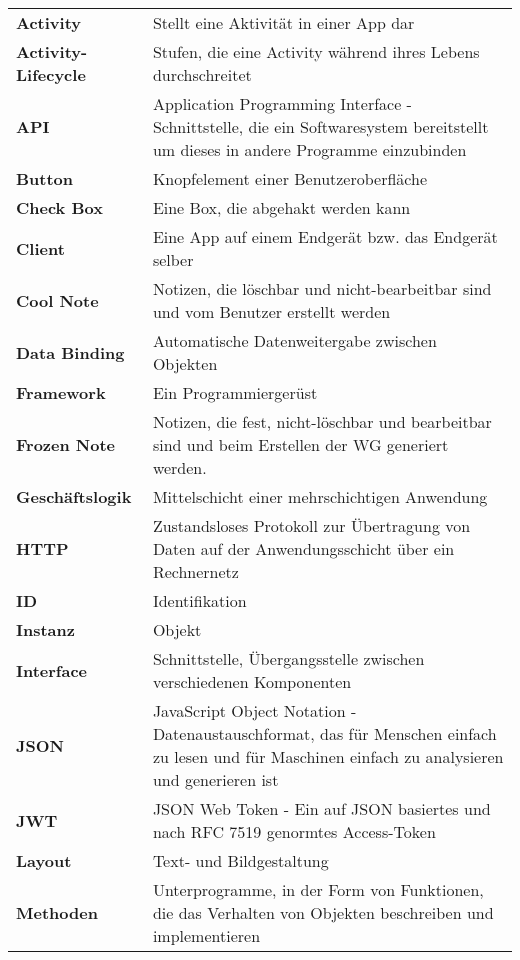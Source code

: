 \begin{table}[h!]
			\centering
			\label{my-label}
			\begin{tabular}{p{4cm}p{10cm}}
				\textbf{Activity} & Stellt eine Aktivität in einer App dar   \\
				\textbf{Activity-Lifecycle}& Stufen, die eine Activity während ihres Lebens durchschreitet   \\
				\textbf{API} & Application Programming Interface - Schnittstelle, die ein Softwaresystem bereitstellt um dieses in andere Programme einzubinden  \\
				\textbf{Button} & Knopfelement einer Benutzeroberfläche\\
				\textbf{Check Box} &  Eine Box, die abgehakt werden kann \\
				\textbf{Client} & Eine App auf einem Endgerät bzw. das Endgerät selber  \\
				\textbf{Cool Note} & Notizen, die löschbar und nicht-bearbeitbar sind und vom Benutzer erstellt werden   \\
				\textbf{Data Binding} & Automatische Datenweitergabe zwischen Objekten  \\
				\textbf{Framework} & Ein Programmiergerüst \\
				\textbf{Frozen Note} & Notizen, die fest, nicht-löschbar und bearbeitbar sind und beim Erstellen der WG generiert werden.   \\
				\textbf{Geschäftslogik} & Mittelschicht einer mehrschichtigen Anwendung  \\
				\textbf{HTTP} & Zustandsloses Protokoll zur Übertragung von Daten auf der Anwendungsschicht über ein Rechnernetz  \\
				\textbf{ID} &  Identifikation \\	
				\textbf{Instanz} & Objekt  \\
				\textbf{Interface} & Schnittstelle, Übergangsstelle zwischen verschiedenen Komponenten  \\
				\textbf{JSON} & JavaScript Object Notation - Datenaustauschformat, das für Menschen einfach zu lesen und für Maschinen einfach zu analysieren und generieren ist   \\
				\textbf{JWT} &  JSON Web Token - Ein auf JSON basiertes und nach RFC 7519 genormtes Access-Token \\	
				\textbf{Layout} & Text- und Bildgestaltung \\
				\textbf{Methoden} & Unterprogramme, in der Form von Funktionen, die das Verhalten von Objekten beschreiben und implementieren  \\

\end{tabular}
\end{table}
